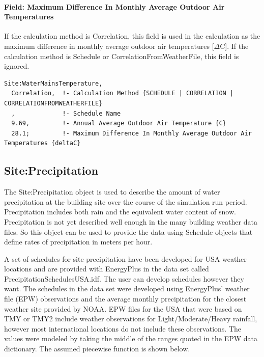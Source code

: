 \paragraph{Field: Maximum Difference In Monthly Average Outdoor Air Temperatures}\label{field-maximum-difference-in-monthly-average-outdoor-air-temperatures}

If the calculation method is Correlation, this field is used in the calculation as the maximum difference in monthly average outdoor air temperatures {[}\(\Delta\)C{]}. If the calculation method is Schedule or CorrelationFromWeatherFile, this field is ignored.

\begin{lstlisting}
Site:WaterMainsTemperature,
  Correlation,  !- Calculation Method {SCHEDULE | CORRELATION | CORRELATIONFROMWEATHERFILE}
  ,             !- Schedule Name
  9.69,         !- Annual Average Outdoor Air Temperature {C}
  28.1;         !- Maximum Difference In Monthly Average Outdoor Air Temperatures {deltaC}
\end{lstlisting}

\subsection{Site:Precipitation}\label{siteprecipitation}

The Site:Precipitation object is used to describe the amount of water precipitation at the building site over the course of the simulation run period. Precipitation includes both rain and the equivalent water content of snow. Precipitation is not yet described well enough in the many building weather data files. So this object can be used to provide the data using Schedule objects that define rates of precipitation in meters per hour.

A set of schedules for site precipitation have been developed for USA weather locations and are provided with EnergyPlus in the data set called PrecipitationSchedulesUSA.idf. The user can develop schedules however they want. The schedules in the data set were developed using EnergyPlus' weather file (EPW) observations and the average monthly precipitation for the closest weather site provided by NOAA. EPW files for the USA that were based on TMY or TMY2 include weather observations for Light/Moderate/Heavy rainfall, however most international locations do not include these observations. The values were modeled by taking the middle of the ranges quoted in the EPW data dictionary. The assumed piecewise function is shown below.

